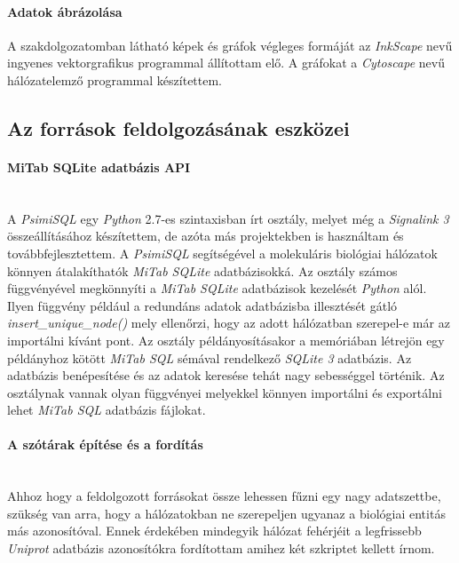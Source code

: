 \documentclass[a4paper,12pt]{article}
\begin{document}
			\paragraph{Adatok ábrázolása}
			A szakdolgozatomban látható képek és gráfok végleges formáját az \textit{InkScape} nevű ingyenes vektorgrafikus programmal állítottam elő. A gráfokat a \textit{Cytoscape} nevű hálózatelemző programmal készítettem.
		
		\subsection{Az források feldolgozásának eszközei}
		
			\paragraph{MiTab SQLite adatbázis API} \mbox{}\\
			A \textit{PsimiSQL} egy \textit{Python} 2.7-es szintaxisban írt osztály, melyet még a \textit{Signalink 3} összeállításához készítettem, de azóta más projektekben is használtam és továbbfejlesztettem. A \textit{PsimiSQL} segítségével a molekuláris biológiai hálózatok könnyen átalakíthatók \textit{MiTab SQLite} adatbázisokká. Az osztály számos függvényével megkönnyíti a \textit{MiTab SQLite} adatbázisok kezelését \textit{Python} alól. Ilyen függvény például a redundáns adatok adatbázisba illesztését gátló \textit{insert\_unique\_node()} mely ellenőrzi, hogy az adott hálózatban szerepel-e már az importálni kívánt pont. Az osztály példányosításakor a memóriában létrejön egy példányhoz kötött \textit{MiTab SQL} sémával rendelkező \textit{SQLite 3} adatbázis. Az adatbázis benépesítése és az adatok keresése tehát nagy sebességgel történik. Az osztálynak vannak olyan függvényei melyekkel könnyen importálni és exportálni lehet \textit{MiTab SQL} adatbázis fájlokat.
			
			\paragraph{A szótárak építése és a fordítás} \mbox{}\\
			Ahhoz hogy a feldolgozott forrásokat össze lehessen fűzni egy nagy adatszettbe, szükség van arra, hogy a hálózatokban ne szerepeljen ugyanaz a biológiai entitás más azonosítóval. Ennek érdekében mindegyik hálózat fehérjéit a legfrissebb \textit{Uniprot} adatbázis azonosítókra fordítottam amihez két szkriptet kellett írnom. 
			
\end{document}
